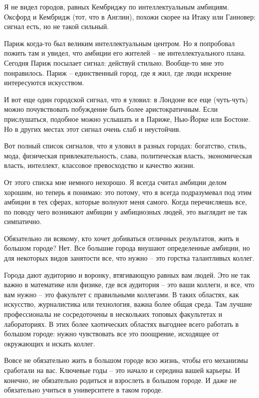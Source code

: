 \documentclass[ebook,12pt,oneside,openany]{memoir}
\begin{document}
Я не видел городов, равных Кембриджу по интеллектуальным амбициям.
Оксфорд и Кембридж (тот, что в Англии), похожи скорее на Итаку или
Ганновер: сигнал есть, но не такой сильный.

Париж когда-то был великим интеллектуальным центром. Но я попробовал
пожить там и увидел, что амбиции его жителей – не интеллектуального
плана. Сегодня Париж посылает сигнал: действуй стильно. Вообще-то мне
это понравилось. Париж – единственный город, где я жил, где люди
искренне интересуются искусством.

И вот еще один городской сигнал, что я уловил: в Лондоне все еще
(чуть-чуть) можно почувствовать побуждение быть более аристократичным.
Если прислушаться, подобное можно услышать и в Париже, Нью-Йорке или
Бостоне. Но в других местах этот сигнал очень слаб и неустойчив.


Вот полный список сигналов, что я уловил в разных городах: богатство,
стиль, мода, физическая привлекательность, слава, политическая власть,
экономическая власть, интеллект, классовое превосходство и качество
жизни.

От этого списка мне немного нехорошо. Я всегда считал амбиции делом
хорошим, но теперь я понимаю: это потому, что я всегда подразумевал
под этим амбиции в тех сферах, которые волнуют меня самого. Когда
перечисляешь все, по поводу чего возникают амбиции у амбициозных
людей, это выглядит не так симпатично.


Обязательно ли всякому, кто хочет добиваться отличных результатов,
жить в большом городе? Нет. Все большие города внушают определенные
амбиции, но для некоторых видов занятости все, что нужно – это горстка
талантливых коллег.

Города дают аудиторию и воронку, втягивающую равных вам людей. Это не
так важно в математике или физике, где вся аудитория – это ваши
коллеги, и все, что вам нужно – это факультет с правильными коллегами.
В таких областях, как искусство, журналистика или технология, важна
более общая среда. Там лучшие профессионалы не сосредоточены в
нескольких топовых факультетах и лабораториях. В этих более
хаотических областях выгоднее всего работать в большом городе: нужно
чувствовать все это поощрение, исходящее от окружающих и искать
коллег.

Вовсе не обязательно жить в большом городе всю жизнь, чтобы его
механизмы сработали на вас. Ключевые годы – это начало и середина
вашей карьеры. И конечно, не обязательно родиться и взрослеть в
большом городе. И даже не обязательно учиться в университете в таком
городе.
\end{document}
